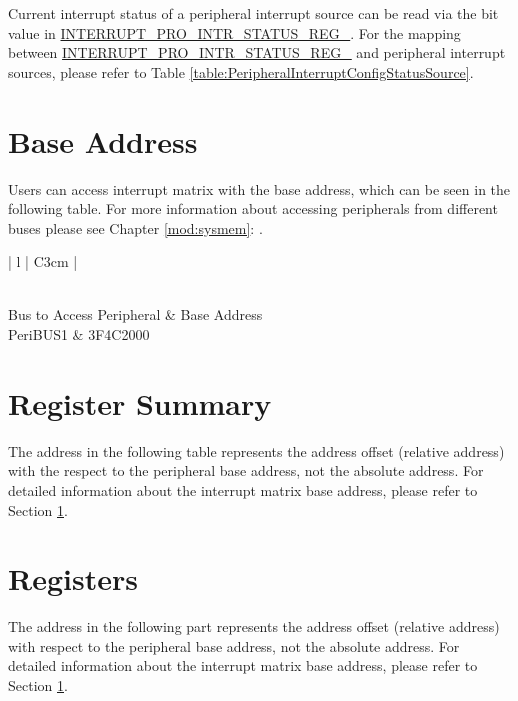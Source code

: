 \documentclass[main\_\_EN.tex]{subfiles}
\begin{document}
Current interrupt status of a peripheral interrupt source can be read via the bit value in \hyperref[regdesc:INTERRUPTPROINTRSTATUSREG0REG]{INTERRUPT\_PRO\_INTR\_STATUS\_REG\_}. For the mapping between \hyperref[regdesc:INTERRUPTPROINTRSTATUSREG0REG]{INTERRUPT\_PRO\_INTR\_STATUS\_REG\_} and peripheral interrupt sources, please refer to Table \ref{table:PeripheralInterruptConfigStatusSource}.


\section{Base Address}\label{subsection:interrupt-matrix-base-address}

Users can access interrupt matrix with the base address, which can be seen in the following table. For more information about accessing peripherals from different buses please see Chapter \ref{mod:sysmem}: \textit{}.


\begin{longtable}[c]{ | l | C{3cm} | }
\caption{Interrupt Matrix Base Address} \label{table:interrupt-matrix-base-address}
\\ \hline
{}
Bus to Access Peripheral & Base Address \\
    \hline
PeriBUS1 & \hexprefix{}3F4C2000 \\
    \hline
\end{longtable}

\hypertarget{intmtrx-reg-summ}{}
\section{Register Summary}

The address in the following table represents the address offset (relative address) with the respect to the peripheral base address, not the absolute address. For detailed information about the interrupt matrix base address, please refer to Section \ref{subsection:interrupt-matrix-base-address}.

\clearpage
\begin{landscape}


\end{landscape}
\restoregeometry

\section{Registers}
The address in the following part represents the address offset (relative address) with respect to the peripheral base address, not the absolute address. For detailed information about the interrupt matrix base address, please refer to Section \ref{subsection:interrupt-matrix-base-address}.

\end{document}
